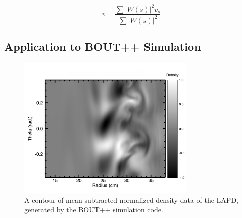 \documentclass{jpp}
\begin{document}
 \begin{equation} v=\frac{\sum\vert W(s)\vert^2 v_s} {\sum \vert W(s) \vert^2}
\label{eq:three}
\end{equation}


\subsection{Application to BOUT++ Simulation}

\begin{figure}
\centerline{\includegraphics[width=8.5cm]{plot_Bout_contour_for_paper}}
\caption{ A contour of mean subtracted normalized density data of the LAPD, generated by the BOUT++ simulation code.}
\label{fig:plot_Bout_contour_for_paper}
\end{figure}
\end{document}
